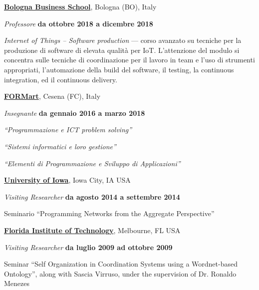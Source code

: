 \documentclass[10pt]{article}
\newenvironment{outerlist}[1][\enskip\textbullet]%
        {\begin{itemize}[#1]}{\end{itemize}%
         \vspace{-.6\baselineskip}}
\newenvironment{innerlist}[1][\enskip\textbullet]%
        {\begin{compactitem}[#1]}{\end{compactitem}}
\newcommand{\halfblankline}{\quad\vspace{-0.5\baselineskip}\pagebreak[3]}
\begin{document}
\href{https://www.bbs.unibo.eu/hp/}{\textbf{Bologna Business School}}, Bologna (BO), Italy
\begin{outerlist}
\item[] \textit{Professore} \hfill \textbf{da ottobre 2018 a dicembre 2018}
    \begin{innerlist}
        \item \textit{Internet of Things -- Software production} --- corso avanzato su 
tecniche per la produzione di software di elevata qualità per IoT. L'attenzione del modulo 
si concentra sulle tecniche di coordinazione per il lavoro in team e l'uso di strumenti 
appropriati, l'automazione della build del software, il testing, la continuous integration, ed il 
continuous delivery.
\end{innerlist}
\halfblankline
\end{outerlist}

\href{http://www.formart.it/}{\textbf{FORMart}}, Cesena (FC), Italy
\begin{outerlist}
\item[] \textit{Insegnante} \hfill \textbf{da gennaio 2016 a marzo 2018}
    \begin{innerlist}
        \item \textit{``Programmazione e ICT problem solving''}
        \item \textit{``Sistemi informatici e loro gestione''}
        \item \textit{``Elementi di Programmazione e Sviluppo di Applicazioni''}
    \end{innerlist}
\halfblankline
\end{outerlist}

\href{http://www.uiowa.edu/}{\textbf{University of Iowa}}, Iowa City, IA USA
\begin{outerlist}
 \item[] \textit{Visiting Researcher} \hfill \textbf{da agosto 2014 a settembre 2014}
    \begin{innerlist}
      \item Seminario ``Programming Networks from the Aggregate Perspective''
    \end{innerlist}
\halfblankline
\end{outerlist}

\href{http://www.fit.edu/}{\textbf{Florida Institute of Technology}}, Melbourne, FL USA
\begin{outerlist}
 \item[] \textit{Visiting Researcher} \hfill \textbf{da luglio 2009 ad ottobre 2009}
    \begin{innerlist}
      \item Seminar ``Self Organization in Coordination Systems using a Wordnet-based Ontology'', along with Sascia Virruso, under the supervision of Dr. Ronaldo Menezes
    \end{innerlist}
\halfblankline
\end{outerlist}
\end{document}
